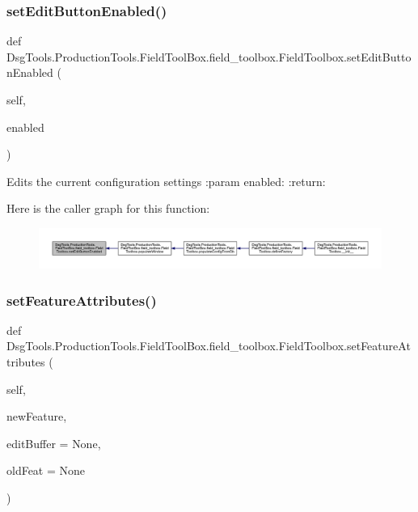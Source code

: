 \subsubsection{\texorpdfstring{set\+Edit\+Button\+Enabled()}{setEditButtonEnabled()}}
{\footnotesize\ttfamily def Dsg\+Tools.\+Production\+Tools.\+Field\+Tool\+Box.\+field\+\_\+toolbox.\+Field\+Toolbox.\+set\+Edit\+Button\+Enabled (\begin{DoxyParamCaption}\item[{}]{self,  }\item[{}]{enabled }\end{DoxyParamCaption})}

\begin{DoxyVerb}Edits the current configuration settings
:param enabled:
:return:
\end{DoxyVerb}
 Here is the caller graph for this function\+:
\nopagebreak
\begin{figure}[H]
\begin{center}
\leavevmode
\includegraphics[width=350pt]{class_dsg_tools_1_1_production_tools_1_1_field_tool_box_1_1field__toolbox_1_1_field_toolbox_a84e0b371a8fd1346e789c0a25bda6716_icgraph}
\end{center}
\end{figure}
\mbox{\label{class_dsg_tools_1_1_production_tools_1_1_field_tool_box_1_1field__toolbox_1_1_field_toolbox_a7ab94771efb094f3d331a9689c3af017}} 
\subsubsection{\texorpdfstring{set\+Feature\+Attributes()}{setFeatureAttributes()}}
{\footnotesize\ttfamily def Dsg\+Tools.\+Production\+Tools.\+Field\+Tool\+Box.\+field\+\_\+toolbox.\+Field\+Toolbox.\+set\+Feature\+Attributes (\begin{DoxyParamCaption}\item[{}]{self,  }\item[{}]{new\+Feature,  }\item[{}]{edit\+Buffer = {\ttfamily None},  }\item[{}]{old\+Feat = {\ttfamily None} }\end{DoxyParamCaption})}

